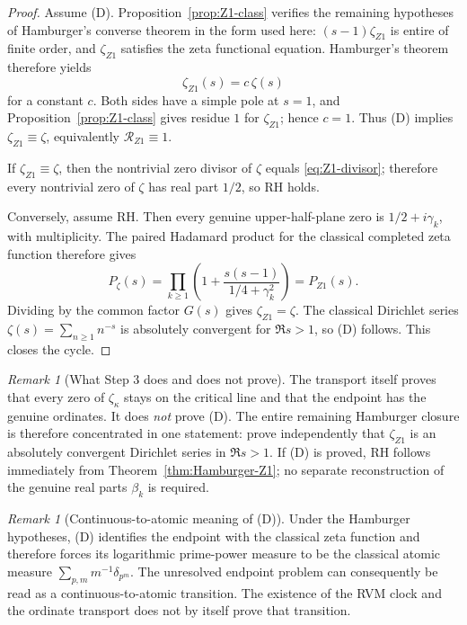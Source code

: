 \documentclass[11pt,reqno]{amsart}
\theoremstyle{definition}
\theoremstyle{remark}
\newtheorem{remark}[theorem]{Remark}
\begin{document}
\begin{proof}
Assume (D).  Proposition~\ref{prop:Z1-class} verifies the remaining hypotheses of Hamburger's converse theorem in the form used here: $(s-1)\zeta_{Z1}$ is entire of finite order, and $\zeta_{Z1}$ satisfies the zeta functional equation.  Hamburger's theorem therefore yields
\[
 \zeta_{Z1}(s)=c\,\zeta(s)
\]
for a constant $c$.  Both sides have a simple pole at $s=1$, and Proposition~\ref{prop:Z1-class} gives residue $1$ for $\zeta_{Z1}$; hence $c=1$.  Thus (D) implies $\zeta_{Z1}\equiv\zeta$, equivalently $\mathscr R_{Z1}\equiv1$.

If $\zeta_{Z1}\equiv\zeta$, then the nontrivial zero divisor of $\zeta$ equals \eqref{eq:Z1-divisor}; therefore every nontrivial zero of $\zeta$ has real part $1/2$, so RH holds.

Conversely, assume RH.  Then every genuine upper-half-plane zero is $1/2+i\gamma_k$, with multiplicity.  The paired Hadamard product for the classical completed zeta function therefore gives
\[
 P_\zeta(s)=\prod_{k\ge1}
 \left(1+\frac{s(s-1)}{1/4+\gamma_k^2}\right)
 =P_{Z1}(s).
\]
Dividing by the common factor $G(s)$ gives $\zeta_{Z1}=\zeta$.  The classical Dirichlet series $\zeta(s)=\sum_{n\ge1}n^{-s}$ is absolutely convergent for $\Re s>1$, so (D) follows.  This closes the cycle.
\end{proof}

\begin{remark}[What Step 3 does and does not prove]\label{rem:Step3-status}
The transport itself proves that every zero of $\zeta_\kappa$ stays on the critical line and that the endpoint has the genuine ordinates.  It does \emph{not} prove (D).  The entire remaining Hamburger closure is therefore concentrated in one statement: prove independently that $\zeta_{Z1}$ is an absolutely convergent Dirichlet series in $\Re s>1$.  If (D) is proved, RH follows immediately from Theorem~\ref{thm:Hamburger-Z1}; no separate reconstruction of the genuine real parts $\beta_k$ is required.
\end{remark}

\begin{remark}[Continuous-to-atomic meaning of (D)]\label{rem:D-atomic}
Under the Hamburger hypotheses, (D) identifies the endpoint with the classical zeta function and therefore forces its logarithmic prime-power measure to be the classical atomic measure $\sum_{p,m}m^{-1}\delta_{p^m}$.  The unresolved endpoint problem can consequently be read as a continuous-to-atomic transition.  The existence of the RVM clock and the ordinate transport does not by itself prove that transition.
\end{remark}
\end{document}
